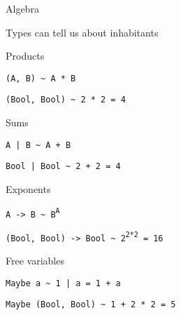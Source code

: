 \begin{frame}
\begin{block}{Algebra}
\begin{center}
Types can tell us about inhabitants
\end{center}
\end{block}
\end{frame}

\begin{frame}
\begin{block}{Products}
\begin{center}
\lstinline{(A, B) ~ A * B}

\lstinline{(Bool, Bool) ~ 2 * 2 = 4}
\end{center}
\end{block}
\end{frame}

\begin{frame}
\begin{block}{Sums}
\begin{center}
\lstinline{A | B ~ A + B}

\lstinline{Bool | Bool ~ 2 + 2 = 4}
\end{center}
\end{block}
\end{frame}

\begin{frame}
\begin{block}{Exponents}
\begin{center}
\lstinline{A -> B ~ B}\textsuperscript{\lstinline{A}}

\lstinline{(Bool, Bool) -> Bool ~ 2}\textsuperscript{\lstinline{2*2}}\lstinline{ = 16}
\end{center}
\end{block}
\end{frame}

\begin{frame}
\begin{block}{Free variables}
\begin{center}
\lstinline{Maybe a ~ 1 | a = 1 + a}

\lstinline{Maybe (Bool, Bool) ~ 1 + 2 * 2 = 5}
\end{center}
\end{block}
\end{frame}
